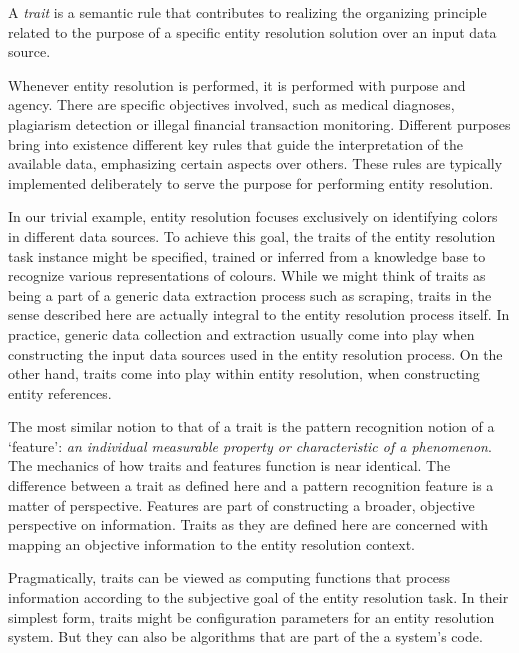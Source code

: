 \begin{defn}
    A \textit{trait} is a semantic rule that contributes to realizing the
    organizing principle related to the purpose of a specific entity resolution
    solution over an input data source.
\end{defn}

Whenever entity resolution is performed, it is performed with purpose and
agency.
There are specific objectives involved, such as medical diagnoses, plagiarism
detection or illegal financial transaction monitoring.
Different purposes bring into existence different key rules that guide the
interpretation of the available data, emphasizing certain aspects over others.
These rules are typically implemented deliberately to serve the purpose for
performing entity resolution.

In our trivial example, entity resolution focuses exclusively on identifying
colors in different data sources.
To achieve this goal, the traits of the entity resolution task instance
might be specified, trained or inferred from a knowledge base to recognize
various representations of colours.
While we might think of traits as being a part of a generic data extraction
process such as scraping, traits in the sense described here are actually
integral to the entity resolution process itself.
In practice, generic data collection and extraction usually come into play when
constructing the input data sources used in the entity resolution process.
On the other hand, traits come into play within entity resolution, when
constructing entity references.

The most similar notion to that of a trait is the pattern recognition notion of
a `feature':
\textit{an individual measurable property or characteristic of a
phenomenon}\cite{bishop2006pattern}.
The mechanics of how traits and features function is near identical.
The difference between a trait as defined here and a pattern recognition feature
is a matter of perspective.
Features are part of constructing a broader, objective perspective on
information.
Traits as they are defined here are concerned with mapping an objective
information to the entity resolution context.

Pragmatically, traits can be viewed as computing functions that process
information according to the subjective goal of the entity resolution task.
In their simplest form, traits might be configuration parameters for an
entity resolution system.
But they can also be algorithms that are part of the a system's code.

